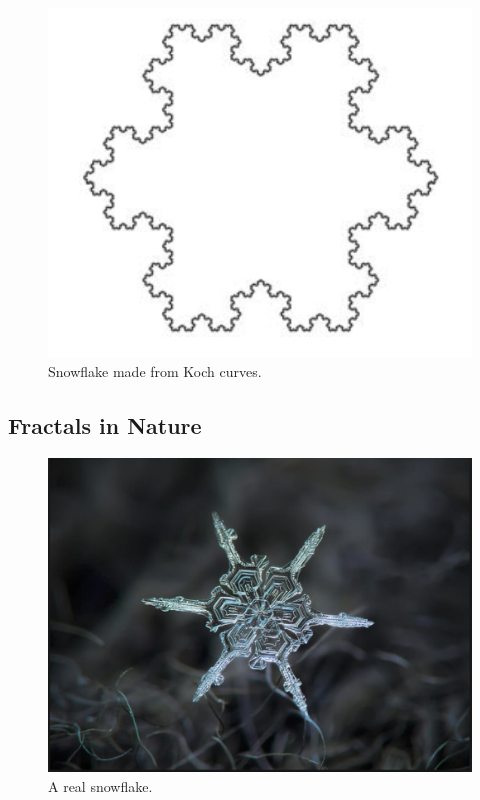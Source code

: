 \begin{figure}[h!]
  \includegraphics[width=\linewidth]{Pictures/snowflake.png}
  \caption{Snowflake made from Koch curves.}
  \label{fig:snowflake}
\end{figure}

\subsection{Fractals in Nature}
\begin{figure}[h!]
  \includegraphics[width=\linewidth]{Pictures/real_snowflake.png}
  \caption{A real snowflake.}
  \label{fig:real_snowflake}
\end{figure}
